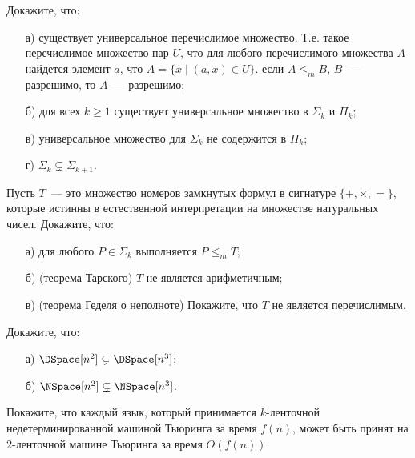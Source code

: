 \begin{task}
    Докажите, что:
    \begin{enumerate}[topsep = 0pt, itemsep = -1ex]
        \item [а)] существует универсальное перечислимое множество. Т.е. такое перечислимое множество пар $U$, что для любого
		    перечислимого множества $A$ найдется элемент $a$, что $A = \{x \mid (a, x) \in U\}$. если $A {\le}_{m} B$, $B$~---
            разрешимо, то $A$~--- разрешимо;
        \item [б)] для всех $k \ge 1$ существует универсальное множество в $\Sigma_k$ и $\Pi_k$;
        \item [в)] универсальное множество для $\Sigma_k$ не содержится в $\Pi_k$;
        \item [г)] $\Sigma_k \subsetneq \Sigma_{k + 1}$.
    \end{enumerate}
\end{task}


\begin{task}
	Пусть $T$~--- это множество номеров замкнутых формул в сигнатуре $\{+, \times, =\}$, которые истинны в естественной
    интерпретации на множестве натуральных чисел. Докажите, что:
    \begin{enumerate}[topsep = 0pt, itemsep = -1ex]
        \item [а)] для любого $P \in \Sigma_k$ выполняется $P \le_m T$;
        \item [б)] (теорема Тарского) $T$ не является арифметичным;
        \item [в)] (теорема Геделя о неполноте) Покажите, что $T$ не является перечислимым.
    \end{enumerate}
\end{task}


\begin{task}
	Докажите, что:
    \begin{enumerate}[topsep = 0pt, itemsep = -1ex]
		\item [а)] $\DSpace[n^2] \subsetneq \DSpace[n^3]$;
        \item [б)] $\NSpace[n^2] \subsetneq \NSpace[n^3]$.
    \end{enumerate}
\end{task}


\breakline

\begin{ptask}{8}
    Покажите, что каждый язык, который принимается $k$-ленточной недетерминированной машиной Тьюринга за время $f(n)$, может быть
    принят на $2$-ленточной машине Тьюринга за время $O(f(n))$.
\end{ptask}

